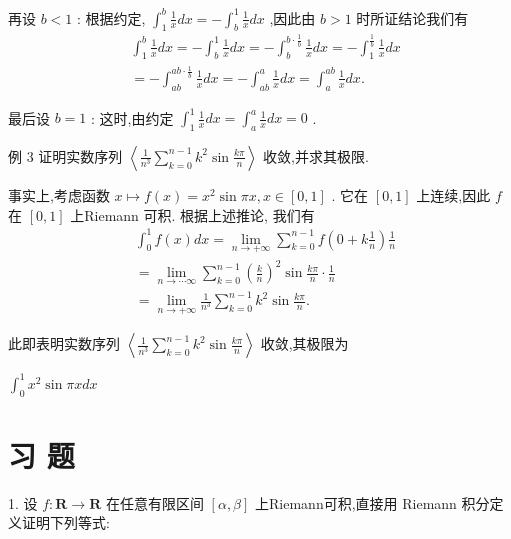 再设 $b < 1$ : 根据约定, ${\int }_{1}^{b}\frac{1}{x}{dx} =  - {\int }_{b}^{1}\frac{1}{x}{dx}$ ,因此由 $b > 1$ 时所证结论我们有
\begin{align*}
	&{\int }_{1}^{b}\frac{1}{x}{dx} =  - {\int }_{b}^{1}\frac{1}{x}{dx} =  - {\int }_{b}^{b \cdot  \frac{1}{b}}\frac{1}{x}{dx} =  - {\int }_{1}^{\frac{1}{b}}\frac{1}{x}{dx}\\
	&=  - {\int }_{ab}^{{ab} \cdot  \frac{1}{b}}\frac{1}{x}{dx} =  - {\int }_{ab}^{a}\frac{1}{x}{dx} = {\int }_{a}^{ab}\frac{1}{x}{dx}.
\end{align*}

最后设 $b = 1$ : 这时,由约定 ${\int }_{1}^{1}\frac{1}{x}{dx} = {\int }_{a}^{a}\frac{1}{x}{dx} = 0$ .

例 3 证明实数序列 $\left\langle  {\frac{1}{{n}^{3}}\mathop{\sum }\limits_{{k = 0}}^{{n - 1}}{k}^{2}\sin \frac{k\pi }{n}}\right\rangle$ 收敛,并求其极限.

事实上,考虑函数 $x \mapsto  f\left( x\right)  = {x}^{2}\sin {\pi x},x \in  \left\lbrack  {0,1}\right\rbrack$ . 它在 $\left\lbrack  {0,1}\right\rbrack$ 上连续,因此 $f$ 在 $\left\lbrack  {0,1}\right\rbrack$ 上Riemann 可积. 根据上述推论, 我们有
\begin{align*}
	&{\int }_{0}^{1}f\left( x\right) {dx} = \mathop{\lim }\limits_{{n \rightarrow   + \infty }}\mathop{\sum }\limits_{{k = 0}}^{{n - 1}}f\left( {0 + k\frac{1}{n}}\right) \frac{1}{n}\\
	&= \mathop{\lim }\limits_{{n \rightarrow  \cdots \infty }}\mathop{\sum }\limits_{{k = 0}}^{{n - 1}}{\left( \frac{k}{n}\right) }^{2}\sin \frac{k\pi }{n} \cdot  \frac{1}{n}\\
	&= \mathop{\lim }\limits_{{n \rightarrow   + \infty }}\frac{1}{{n}^{3}}\mathop{\sum }\limits_{{k = 0}}^{{n - 1}}{k}^{2}\sin \frac{k\pi }{n}.
\end{align*}

此即表明实数序列 $\left\langle  {\frac{1}{{n}^{3}}\mathop{\sum }\limits_{{k = 0}}^{{n - 1}}{k}^{2}\sin \frac{k\pi }{n}}\right\rangle$ 收敛,其极限为

${\int }_{0}^{1}{x}^{2}\sin {\pi xdx}$

\section*{习 题}

1. 设 $f : \mathbf{R} \rightarrow  \mathbf{R}$ 在任意有限区间 $\left\lbrack  {\alpha ,\beta }\right\rbrack$ 上Riemann可积,直接用 Riemann 积分定义证明下列等式:

